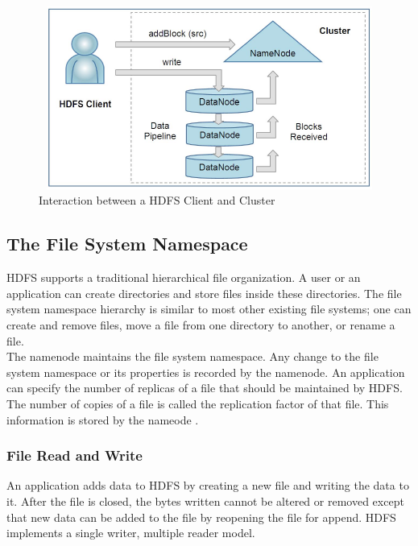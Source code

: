 \begin{figure}[H]
\begin{center}
\includegraphics[width=13.5cm,height=6cm]{chapter2/fig1.png}
\end{center}
\caption{Interaction between a HDFS Client and Cluster}
\label{interaction}
\end{figure}


\subsection{The File System Namespace}

HDFS supports a traditional hierarchical file organization. A user or an application can create directories and store files inside these directories. The file system namespace hierarchy is similar to most other existing file systems; one can create and remove files, move a file from one directory to another, or rename a file.\\

The namenode maintains the file system namespace. Any change to the file system namespace or its properties is recorded by the namenode. An application can specify the number of replicas of a file that should be maintained by HDFS. The number of copies of a file is called the replication factor of that file. This information is stored by the nameode \cite{cite23}.\\

\subsubsection{File Read and Write}

An application adds data to HDFS by creating a new file and writing the data to it. After the file is closed, the bytes written cannot be altered or removed except that new data can be added to the file by reopening the file for append. HDFS implements a single writer, multiple reader model.\\ 

